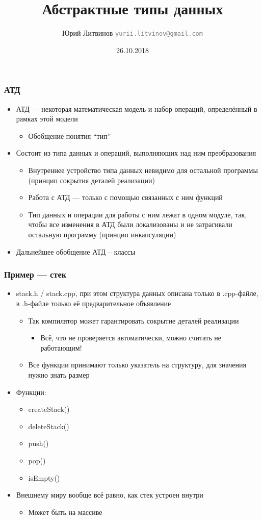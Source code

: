\documentclass[xetex,mathserif,serif]{beamer}
\title{Абстрактные типы данных}
\author[Юрий Литвинов]{Юрий Литвинов \newline \textcolor{gray}{\small\texttt{yurii.litvinov@gmail.com}}}
\date{26.10.2018}
\begin{document}
	
	\frame{\titlepage}
	
	\begin{frame}
		\frametitle{АТД}
		\begin{itemize}
			\item АТД --- некоторая математическая модель и набор операций, определённый в рамках этой модели
			\begin{itemize}
				\item Обобщение понятия ``тип''
			\end{itemize}
			\item Состоит из типа данных и операций, выполняющих над ним преобразования
			\begin{itemize}
				\item Внутреннее устройство типа данных невидимо для остальной программы (принцип сокрытия деталей реализации)
				\item Работа с АТД --- только с помощью связанных с ним функций
				\item Тип данных и операции для работы с ним лежат в одном модуле, так, чтобы все изменения в АТД были локализованы и не затрагивали остальную программу (принцип инкапсуляции)
			\end{itemize}
			\item Дальнейшее обобщение АТД – классы
		\end{itemize}
	\end{frame}

	\begin{frame}
		\frametitle{Пример --- стек}
		\begin{itemize}
			\item stack.h / stack.cpp, при этом структура данных описана только в .cpp-файле, в .h-файле только её предварительное объявление
			\begin{itemize}
				\item Так компилятор может гарантировать сокрытие деталей реализации
				\begin{itemize}
					\item Всё, что не проверяется автоматически, можно считать не работающим!
				\end{itemize}
				\item Все функции принимают только указатель на структуру, для значения нужно знать размер
			\end{itemize}
			\item Функции:
			\begin{itemize}
				\item createStack()
				\item deleteStack()
				\item push()
				\item pop()
				\item isEmpty()
			\end{itemize}
			\item Внешнему миру вообще всё равно, как стек устроен внутри
			\begin{itemize}
				\item Может быть на массиве
			\end{itemize}
		\end{itemize}
	\end{frame}
\end{document}
